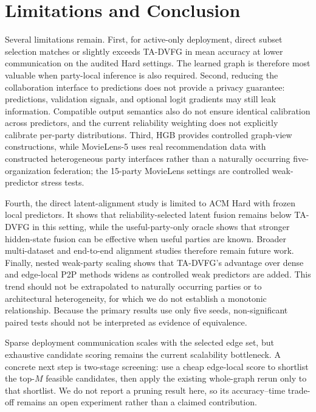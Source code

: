 \documentclass[letterpaper]{article} %
\newcommand{\method}{\textsc{TA-DVFG}}
\begin{document}
\section{Limitations and Conclusion}

Several limitations remain. First, for active-only deployment, direct subset
selection matches or slightly exceeds \method{} in mean accuracy at lower
communication on the audited Hard settings. The learned graph is therefore most
valuable when party-local inference is also required. Second, reducing the
collaboration interface to predictions does not provide a privacy guarantee:
predictions, validation signals, and optional logit gradients may still leak
information. Compatible output semantics also do not ensure identical
calibration across predictors, and the current reliability weighting does not
explicitly calibrate per-party distributions. Third, HGB provides controlled
graph-view constructions, while
MovieLens-5 uses real recommendation data with constructed heterogeneous party
interfaces rather than a naturally occurring five-organization federation; the
15-party MovieLens settings are controlled weak-predictor stress tests.

Fourth, the direct latent-alignment study is limited to ACM Hard with frozen
local predictors. It shows that reliability-selected latent fusion remains below
\method{} in this setting, while the useful-party-only oracle shows that stronger
hidden-state fusion can be effective when useful parties are known. Broader
multi-dataset and end-to-end alignment studies therefore remain future work.
Finally, nested weak-party scaling shows that \method{}'s advantage over
dense and edge-local P2P methods widens as controlled weak predictors are
added. This trend should not be extrapolated to naturally occurring parties
or to architectural heterogeneity, for which we do not establish a monotonic
relationship. Because the primary results use only five seeds, non-significant paired
tests should not be interpreted as evidence of equivalence.

Sparse deployment communication scales with the selected edge set, but
exhaustive candidate scoring remains the current scalability bottleneck. A
concrete next step is two-stage screening: use a cheap edge-local score to
shortlist the top-$M$ feasible candidates, then apply the existing whole-graph
rerun only to that shortlist. We do not report a pruning result here, so its
accuracy--time trade-off remains an open experiment rather than a claimed
contribution.
\end{document}
